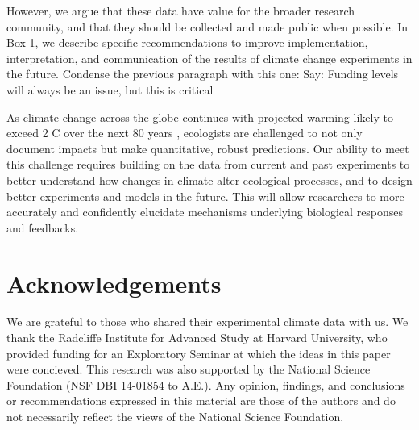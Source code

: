 \documentclass{article}
\begin{document}
 However, we argue that these data have value for the broader research community, and that they should be collected and made public when possible. In Box 1, we describe specific recommendations to improve implementation, interpretation, and communication of the results of climate change experiments in the future. %
Condense the previous paragraph with this one:
Say: Funding levels will always be an issue, but this is critical
 
 \par 
As climate change across the globe continues with projected warming likely to exceed 2 \degree C over the next 80 years \citep{ipcc2013}, ecologists are challenged to not only document impacts but make quantitative, robust predictions. Our ability to meet this challenge requires building on the data from current and past experiments to better understand how changes in climate alter ecological processes, and to design better experiments and models in the future. This will allow researchers to more accurately and confidently elucidate mechanisms underlying biological responses and feedbacks.
\section* {Acknowledgements}
We are grateful to those who shared their experimental climate data with us. We thank the Radcliffe Institute for Advanced Study at Harvard University, who provided funding for an Exploratory Seminar at which the ideas in this paper were concieved. This research was also supported by the National Science Foundation (NSF DBI 14-01854 to A.E.). Any opinion, findings, and conclusions or recommendations expressed in this material are those of the authors and do not necessarily reflect the views of the National Science Foundation.
\end{document}
